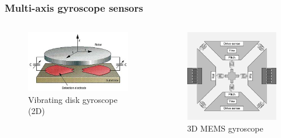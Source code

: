 \documentclass[10pt]{beamer}
\begin{document}
\begin{frame}
\frametitle{Multi-axis gyroscope sensors}
\begin{columns}
    \begin{column}{.60\textwidth}
        \begin{figure}
            \centering
            \includegraphics[width=1.0\linewidth]{vibrating_disk.png}
            \caption{Vibrating disk gyroscope (2D)}
        \end{figure}
    \end{column}
    \hfill
    \begin{column}{.50\textwidth}
        \begin{figure}
            \centering
            \includegraphics[width=1.0\linewidth]{gyro_mems_3in1.png}
            \caption{3D MEMS gyroscope}
        \end{figure}
    \end{column}
\end{columns}
\end{frame}
\end{document}
